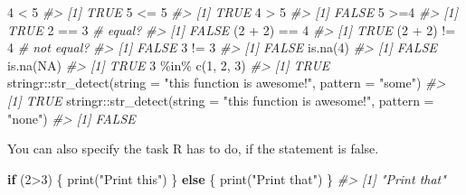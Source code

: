 \documentclass[
]{article}
\newenvironment{Shaded}{\begin{snugshade}}{\end{snugshade}}
\newcommand{\AttributeTok}[1]{\textcolor[rgb]{0.77,0.63,0.00}{#1}}
\newcommand{\CommentTok}[1]{\textcolor[rgb]{0.56,0.35,0.01}{\textit{#1}}}
\newcommand{\ConstantTok}[1]{\textcolor[rgb]{0.00,0.00,0.00}{#1}}
\newcommand{\ControlFlowTok}[1]{\textcolor[rgb]{0.13,0.29,0.53}{\textbf{#1}}}
\newcommand{\DecValTok}[1]{\textcolor[rgb]{0.00,0.00,0.81}{#1}}
\newcommand{\FunctionTok}[1]{\textcolor[rgb]{0.00,0.00,0.00}{#1}}
\newcommand{\NormalTok}[1]{#1}
\newcommand{\SpecialCharTok}[1]{\textcolor[rgb]{0.00,0.00,0.00}{#1}}
\newcommand{\StringTok}[1]{\textcolor[rgb]{0.31,0.60,0.02}{#1}}
\begin{document}
\begin{Shaded}
\begin{Highlighting}[]
\DecValTok{4} \SpecialCharTok{\textless{}} \DecValTok{5}
\CommentTok{\#\textgreater{} [1] TRUE}
\DecValTok{5} \SpecialCharTok{\textless{}=} \DecValTok{5}
\CommentTok{\#\textgreater{} [1] TRUE}
\DecValTok{4} \SpecialCharTok{\textgreater{}} \DecValTok{5}
\CommentTok{\#\textgreater{} [1] FALSE}
\DecValTok{5} \SpecialCharTok{\textgreater{}=}\DecValTok{4}
\CommentTok{\#\textgreater{} [1] TRUE}
\DecValTok{2} \SpecialCharTok{==} \DecValTok{3} \CommentTok{\# equal?}
\CommentTok{\#\textgreater{} [1] FALSE}
\NormalTok{(}\DecValTok{2} \SpecialCharTok{+} \DecValTok{2}\NormalTok{) }\SpecialCharTok{==} \DecValTok{4}
\CommentTok{\#\textgreater{} [1] TRUE}
\NormalTok{(}\DecValTok{2} \SpecialCharTok{+} \DecValTok{2}\NormalTok{) }\SpecialCharTok{!=} \DecValTok{4} \CommentTok{\# not equal?}
\CommentTok{\#\textgreater{} [1] FALSE}
\DecValTok{3} \SpecialCharTok{!=} \DecValTok{3}
\CommentTok{\#\textgreater{} [1] FALSE}
\FunctionTok{is.na}\NormalTok{(}\DecValTok{4}\NormalTok{)}
\CommentTok{\#\textgreater{} [1] FALSE}
\FunctionTok{is.na}\NormalTok{(}\ConstantTok{NA}\NormalTok{)}
\CommentTok{\#\textgreater{} [1] TRUE}
\DecValTok{3} \SpecialCharTok{\%in\%} \FunctionTok{c}\NormalTok{(}\DecValTok{1}\NormalTok{, }\DecValTok{2}\NormalTok{, }\DecValTok{3}\NormalTok{)}
\CommentTok{\#\textgreater{} [1] TRUE}
\NormalTok{stringr}\SpecialCharTok{::}\FunctionTok{str\_detect}\NormalTok{(}\AttributeTok{string =} \StringTok{"this function is awesome!"}\NormalTok{, }\AttributeTok{pattern =} \StringTok{"some"}\NormalTok{)}
\CommentTok{\#\textgreater{} [1] TRUE}
\NormalTok{stringr}\SpecialCharTok{::}\FunctionTok{str\_detect}\NormalTok{(}\AttributeTok{string =} \StringTok{"this function is awesome!"}\NormalTok{, }\AttributeTok{pattern =} \StringTok{"none"}\NormalTok{)}
\CommentTok{\#\textgreater{} [1] FALSE}
\end{Highlighting}
\end{Shaded}

You can also specify the task R has to do, if the statement is false.

\begin{Shaded}
\begin{Highlighting}[]
\ControlFlowTok{if}\NormalTok{ (}\DecValTok{2}\SpecialCharTok{\textgreater{}}\DecValTok{3}\NormalTok{) \{}
  \FunctionTok{print}\NormalTok{(}\StringTok{"Print this"}\NormalTok{)}
\NormalTok{\} }\ControlFlowTok{else}\NormalTok{ \{}
  \FunctionTok{print}\NormalTok{(}\StringTok{"Print that"}\NormalTok{)}
\NormalTok{\}}
\CommentTok{\#\textgreater{} [1] "Print that"}
\end{Highlighting}
\end{Shaded}
\end{document}
